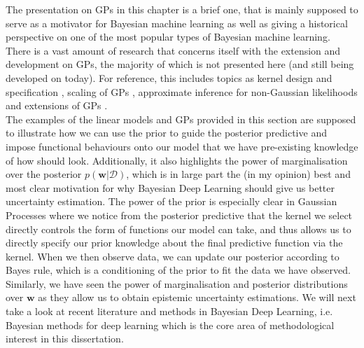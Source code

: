 \noindent The presentation on GPs in this chapter is a brief one, that is mainly supposed to serve as a motivator for Bayesian machine learning as well as giving a historical perspective on one of the most popular types of Bayesian machine learning. There is a vast amount of research that concerns itself with the extension and development on GPs, the majority of which is not presented here (and still being developed on today). For reference, this includes topics as kernel design and specification \citep{2011_additivekernel, 2017_convgp, groth2024kermutcompositekernelregression}, scaling of GPs \citep{2005_inducingpoints, 2020_reducedRankGPR, 2023_hilbertspace}, approximate inference for non-Gaussian likelihoods \citep{1998_GPLaplace, 2001_EP} and extensions of GPs \citep{2003_GPLVM,2013_DGP}.  \\ 


\noindent The examples of the linear models and GPs provided in this section are supposed to illustrate how we can use the prior to guide the posterior predictive and impose functional behaviours onto our model that we have pre-existing knowledge of how should look. Additionally, it also highlights the power of marginalisation over the posterior $p(\mathbf{w}|\mathcal{D})$, which is in large part the (in my opinion) best and most clear motivation for why Bayesian Deep Learning should give us better uncertainty estimation. The power of the prior is especially clear in Gaussian Processes where we notice from the posterior predictive that the kernel we select directly controls the form of functions our model can take, and thus allows us to directly specify our prior knowledge about the final predictive function via the kernel. When we then observe data, we can update our posterior according to Bayes rule, which is a conditioning of the prior to fit the data we have observed. Similarly, we have seen the power of marginalisation and posterior distributions over $\mathbf{w}$ as they allow us to obtain epistemic uncertainty estimations. We will next take a look at recent literature and methods in Bayesian Deep Learning, i.e. Bayesian methods for deep learning which is the core area of methodological interest in this dissertation.\\


